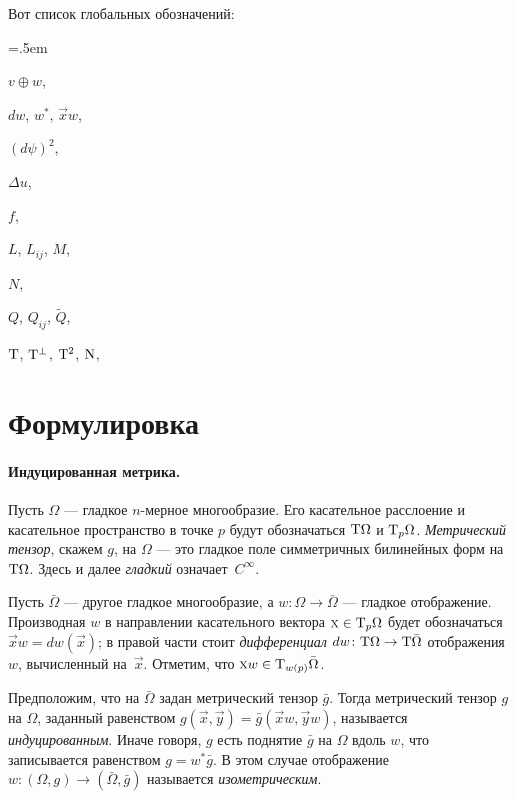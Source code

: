 Вот список глобальных обозначений:
\footnotesize
\begin{list}{}{\leftmargin=.5em}
\item $v\oplus w$, \pageref{oplus}
\item $dw$, $w^*$, $\vec x w$, \pageref{dw}
\item $(d\psi)^2$, \pageref{d2}
\item $\Delta u$, \pageref{Du}
\item $f$, \pageref{f}
\item $L$, $L_{ij}$, $M$, 
\item $N$, \pageref{Nn}
\item $Q$, $Q_{ij}$, $\tilde Q$, 
\item $\mathrm{T}$, $\mathrm{T}^\perp$, $\mathrm{T}^2$, $\operatorname{\rm N}$, \pageref{TTTN}
\end{list}
\spell{\end{multicols}}{}


\section{Формулировка}\label{sec1}

\paragraph{Индуцированная метрика.}
Пусть $\Omega$ --- гладкое $n$-мерное многообразие.
Его касательное расслоение и касательное пространство в точке $p$ будут обозначаться $\mathrm{T}\Omega$ и $\mathrm{T}_p\Omega$. \label{T}
\emph{Метрический тензор}, скажем $g$, на $\Omega$ --- это гладкое поле симметричных билинейных форм на $\mathrm{T}\Omega$.
Здесь и далее \emph{гладкий} означает~$C^\infty$.

Пусть $\bar\Omega$ --- другое гладкое многообразие, а $w\colon\Omega \to \bar\Omega$ --- гладкое отображение.
Производная $w$ в направлении касательного вектора $\text{\rm \textsc{x}} \in \mathrm{T}_p\Omega$ будет обозначаться \label{dw} $\vec x w = dw(\vec x)$;
в правой части стоит \emph{дифференциал} $dw\colon\T\Omega \z\to \T\bar\Omega$ отображения $w$, вычисленный на~$\vec x$.
Отметим, что $\vec x w \z\in \T_{w(p)}\bar\Omega$.

Предположим, что на $\bar\Omega$ задан метрический тензор $\bar g$.
Тогда метрический тензор $g$ на $\Omega$, заданный равенством
$g(\vec x, \vec y) = \bar g(\vec x w, \vec y w)$,
называется \emph{индуцированным}.
Иначе говоря, $g$ есть поднятие $\bar g$ на $\Omega$ вдоль $w$, что записывается равенством $g = w^*\bar g$.
В этом случае отображение $w\colon(\Omega, g)\to(\bar\Omega, \bar g)$ называется \emph{изометрическим}.


